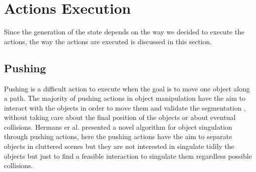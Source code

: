 


\section{Actions Execution}
Since the generation of the state depends on the way we decided to execute the actions, the way the actions are executed is discussed in this section.   

\subsection{Pushing}
\label{subsec:pushing}

Pushing is a difficult action to execute when the goal is to move one object along a path. The majority of pushing actions in object manipulation have the aim to interact with the objects in order to move them and validate the segmentation \citep{katz2014perceiving} \citep{katz2011interactive} \citep{Katz_2013_7407} , without taking care about the final position of the objects or about eventual collisions. Hermans er al. \citep{conf/iros/HermansRB12} presented a novel algorithm for object singulation through pushing actions, here the pushing actions have the aim to separate objects in cluttered scenes but they are not interested in singulate tidily the objects but just to find a feasible interaction to singulate them regardless possible collisions. 



